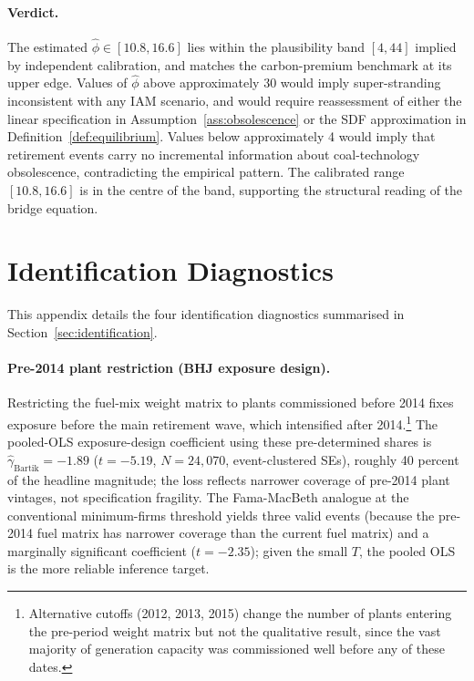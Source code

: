 \documentclass[12pt,a4paper]{article}
\begin{document}
\paragraph{Verdict.} The estimated $\hat\phi \in [10.8, 16.6]$ lies within the plausibility band $[4, 44]$ implied by independent calibration, and matches the carbon-premium benchmark at its upper edge. Values of $\hat\phi$ above approximately 30 would imply super-stranding inconsistent with any IAM scenario, and would require reassessment of either the linear specification in Assumption~\ref{ass:obsolescence} or the SDF approximation in Definition~\ref{def:equilibrium}. Values below approximately 4 would imply that retirement events carry no incremental information about coal-technology obsolescence, contradicting the empirical pattern. The calibrated range $[10.8, 16.6]$ is in the centre of the band, supporting the structural reading of the bridge equation.


\section{Identification Diagnostics}\label{app:identification_diagnostics}

This appendix details the four identification diagnostics summarised in Section~\ref{sec:identification}.

\paragraph{Pre-2014 plant restriction (BHJ exposure design).}
Restricting the fuel-mix weight matrix to plants commissioned before 2014 fixes exposure before the main retirement wave, which intensified after 2014.\footnote{Alternative cutoffs (2012, 2013, 2015) change the number of plants entering the pre-period weight matrix but not the qualitative result, since the vast majority of generation capacity was commissioned well before any of these dates.} The pooled-OLS exposure-design coefficient using these pre-determined shares is $\hat\gamma_{\mathrm{Bartik}} = -1.89$ ($t = -5.19$, $N = 24{,}070$, event-clustered SEs), roughly 40 percent of the headline magnitude; the loss reflects narrower coverage of pre-2014 plant vintages, not specification fragility. The Fama-MacBeth analogue at the conventional minimum-firms threshold yields three valid events (because the pre-2014 fuel matrix has narrower coverage than the current fuel matrix) and a marginally significant coefficient ($t = -2.35$); given the small $T$, the pooled OLS is the more reliable inference target.
\end{document}
